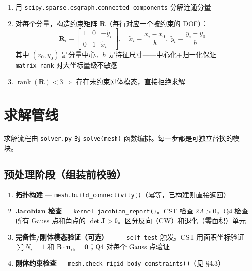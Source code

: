 \documentclass[12pt,a4paper]{ctexart}
\begin{document}
\begin{enumerate}[leftmargin=*]
  \item 用 \texttt{scipy.sparse.csgraph.connected\_components} 分解连通分量
  \item 对每个分量，构造约束矩阵 $\mathbf{R}$（每行对应一个被约束的 DOF）：
  \begin{equation*}
  \mathbf{R}_i = \begin{bmatrix}1 & 0 & -\tilde{y}_i \\ 0 & 1 & \tilde{x}_i\end{bmatrix},
  \quad \tilde{x}_i = \frac{x_i - x_0}{h},\; \tilde{y}_i = \frac{y_i - y_0}{h}
  \end{equation*}
  其中 $(x_0,y_0)$ 是分量中心，$h$ 是特征尺寸——中心化+归一化保证 \texttt{matrix\_rank} 对大坐标量级不敏感
  \item $\operatorname{rank}(\mathbf{R}) < 3 \Rightarrow$ 存在未约束刚体模态，直接拒绝求解
\end{enumerate}

\section{求解管线}

求解流程由 \texttt{solver.py} 的 \texttt{solve(mesh)} 函数编排。每一步都是可独立替换的模块。

\subsection{预处理阶段（组装前校验）}

\begin{enumerate}[leftmargin=*]
  \item \textbf{拓扑构建} — \texttt{mesh.build\_connectivity()}（幂等，已构建则直接返回）
  \item \textbf{Jacobian 检查} — \texttt{kernel.jacobian\_report()}。CST 检查 $2A>0$，Q4 检查所有 Gauss 点和角点的 $\det\mathbf{J}>0$。区分反向（CW）和退化（零面积）单元
  \item \textbf{完备性/刚体模态验证（可选）} — \texttt{-{}-self-test} 触发。CST 用面积坐标验证 $\sum N_i=1$ 和 $\mathbf{B}\cdot\mathbf{u}_{\text{rb}}=\mathbf{0}$；Q4 对每个 Gauss 点验证
  \item \textbf{刚体约束检查} — \texttt{mesh.check\_rigid\_body\_constraints()}（见 \S4.3）
\end{enumerate}
\end{document}
